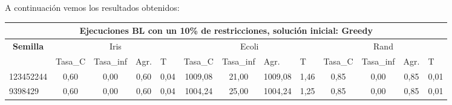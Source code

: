 \documentclass[12pt, spanish]{article}
\begin{document}
A continuación vemos los resultados obtenidos:

\begin{table}[H]
\small
\begin{adjustwidth}{-1cm}{-1cm}%

\begin{tabular}{|l|c|c|c|c|c|c|c|c|c|c|c|c|}
\hline
\multicolumn{13}{|c|}{\textbf{Ejecuciones BL con un 10\% de restricciones, solución inicial: Greedy}}                                                                                                                                                                                                                                                                                                                  \\ \hline
\multicolumn{1}{|c|}{\multirow{2}{*}{\textbf{Semilla}}} & \multicolumn{4}{c|}{Iris}                                                                                          & \multicolumn{4}{c|}{Ecoli}                                                                                         & \multicolumn{4}{c|}{Rand}                                                                                          \\ \cline{2-13} 
\multicolumn{1}{|c|}{}                                  & \multicolumn{1}{l|}{Tasa\_C} & \multicolumn{1}{l|}{Tasa\_inf} & \multicolumn{1}{l|}{Agr.} & \multicolumn{1}{l|}{T} & \multicolumn{1}{l|}{Tasa\_C} & \multicolumn{1}{l|}{Tasa\_inf} & \multicolumn{1}{l|}{Agr.} & \multicolumn{1}{l|}{T} & \multicolumn{1}{l|}{Tasa\_C} & \multicolumn{1}{l|}{Tasa\_inf} & \multicolumn{1}{l|}{Agr.} & \multicolumn{1}{l|}{T} \\ \hline
123452244                                               & 0,60                         & 0,00                           & 0,60                      & 0,04                   & 1009,08                      & 21,00                          & 1009,08                   & 1,46                   & 0,85                         & 0,00                           & 0,85                      & 0,01                   \\ \hline
9398429                                                 & 0,60                         & 0,00                           & 0,60                      & 0,04                   & 1004,24                      & 25,00                          & 1004,24                   & 1,25                   & 0,85                         & 0,00                           & 0,85                      & 0,01                   \\ \hline

\end{tabular}
\end{adjustwidth}
\end{table}
\end{document}
